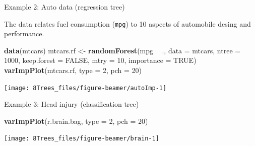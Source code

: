 \documentclass[10pt,ignorenonframetext,]{beamer}
\newenvironment{Shaded}{\begin{snugshade}}{\end{snugshade}}
\newcommand{\KeywordTok}[1]{\textcolor[rgb]{0.13,0.29,0.53}{\textbf{#1}}}
\newcommand{\DataTypeTok}[1]{\textcolor[rgb]{0.13,0.29,0.53}{#1}}
\newcommand{\DecValTok}[1]{\textcolor[rgb]{0.00,0.00,0.81}{#1}}
\newcommand{\StringTok}[1]{\textcolor[rgb]{0.31,0.60,0.02}{#1}}
\newcommand{\OtherTok}[1]{\textcolor[rgb]{0.56,0.35,0.01}{#1}}
\newcommand{\OperatorTok}[1]{\textcolor[rgb]{0.81,0.36,0.00}{\textbf{#1}}}
\newcommand{\NormalTok}[1]{#1}
\begin{document}
\begin{frame}[fragile]

\begin{block}{Example 2: Auto data (regression tree)}

\vspace{1mm}

The data relates fuel consumption (\texttt{mpg}) to 10 aspects of
automobile desing and performance.

\scriptsize

\begin{Shaded}
\begin{Highlighting}[]
\KeywordTok{data}\NormalTok{(mtcars)}
\NormalTok{mtcars.rf <-}\StringTok{ }\KeywordTok{randomForest}\NormalTok{(mpg }\OperatorTok{~}\StringTok{ }\NormalTok{., }\DataTypeTok{data =}\NormalTok{ mtcars, }\DataTypeTok{ntree =} \DecValTok{1000}\NormalTok{, }\DataTypeTok{keep.forest =} \OtherTok{FALSE}\NormalTok{, }
    \DataTypeTok{mtry =} \DecValTok{10}\NormalTok{, }\DataTypeTok{importance =} \OtherTok{TRUE}\NormalTok{)}
\KeywordTok{varImpPlot}\NormalTok{(mtcars.rf, }\DataTypeTok{type =} \DecValTok{2}\NormalTok{, }\DataTypeTok{pch =} \DecValTok{20}\NormalTok{)}
\end{Highlighting}
\end{Shaded}

\begin{center}\texttt{[image: 8Trees\_files/figure-beamer/autoImp-1]} \end{center}

\end{block}

\end{frame}

\begin{frame}[fragile]

\begin{block}{Example 3: Head injury (classification tree)}

\vspace{1mm}

\scriptsize

\begin{Shaded}
\begin{Highlighting}[]
\KeywordTok{varImpPlot}\NormalTok{(r.brain.bag, }\DataTypeTok{type =} \DecValTok{2}\NormalTok{, }\DataTypeTok{pch =} \DecValTok{20}\NormalTok{)}
\end{Highlighting}
\end{Shaded}

\begin{center}\texttt{[image: 8Trees\_files/figure-beamer/brain-1]} \end{center}

\end{block}

\end{frame}
\end{document}
